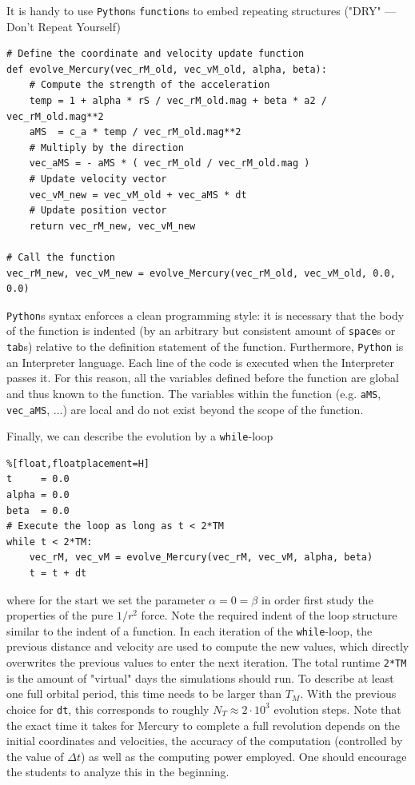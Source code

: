 \documentclass[12pt,ngerman,american]{iopart}
\newcommand{\python}[0]{\texttt{Python}}
\begin{document}
It is handy to use \texttt{Python}s \texttt{function}s to embed repeating structures ("DRY" --- Don't Repeat Yourself)
\begin{lstlisting}
# Define the coordinate and velocity update function
def evolve_Mercury(vec_rM_old, vec_vM_old, alpha, beta):
	# Compute the strength of the acceleration
	temp = 1 + alpha * rS / vec_rM_old.mag + beta * a2 / vec_rM_old.mag**2
	aMS  = c_a * temp / vec_rM_old.mag**2
	# Multiply by the direction
	vec_aMS = - aMS * ( vec_rM_old / vec_rM_old.mag )
	# Update velocity vector
	vec_vM_new = vec_vM_old + vec_aMS * dt
	# Update position vector
	return vec_rM_new, vec_vM_new

# Call the function
vec_rM_new, vec_vM_new = evolve_Mercury(vec_rM_old, vec_vM_old, 0.0, 0.0)
\end{lstlisting}
\python{}s syntax enforces a clean programming style: it is necessary that the body of the function is indented (by an arbitrary but consistent amount of \texttt{space}s or \texttt{tab}s) relative to the definition statement of the function.
Furthermore, \python{} is an Interpreter language.
Each line of the code is executed when the Interpreter passes it.
For this reason, all the variables defined before the function are global and thus known to the function.
The variables within the function (e.g. \texttt{aMS}, \texttt{vec\_aMS}, $\dots$) are local and do not exist beyond the scope of the function.

Finally, we can describe the evolution by a \texttt{while}-loop
\begin{lstlisting}%[float,floatplacement=H]
t     = 0.0
alpha = 0.0
beta  = 0.0
# Execute the loop as long as t < 2*TM
while t < 2*TM:
	vec_rM, vec_vM = evolve_Mercury(vec_rM, vec_vM, alpha, beta)
	t = t + dt
\end{lstlisting}
where for the start we set the parameter $\alpha=0 = \beta$ in order first study the properties of the pure
$1/r^2$ force.
Note the required indent of the loop structure similar to the indent of a function.
In each iteration of the \texttt{while}-loop, the previous distance and velocity are used to compute the new values,
which directly overwrites the previous values to enter the next iteration.
The total runtime \texttt{2*TM} is the amount of "virtual" days the simulations should run.
To describe at least one full orbital period, this time needs to be larger than $T_M$.
With the previous choice for \texttt{dt}, this corresponds to roughly $N_T \approx 2 \cdot 10^3$ evolution steps.
Note that the exact time it takes for Mercury to complete a full revolution depends on the initial coordinates and velocities, the accuracy of the computation
(controlled by the value of $\Delta t$) as well as the computing power employed.
One should encourage the students to analyze this in the beginning.
\end{document}
